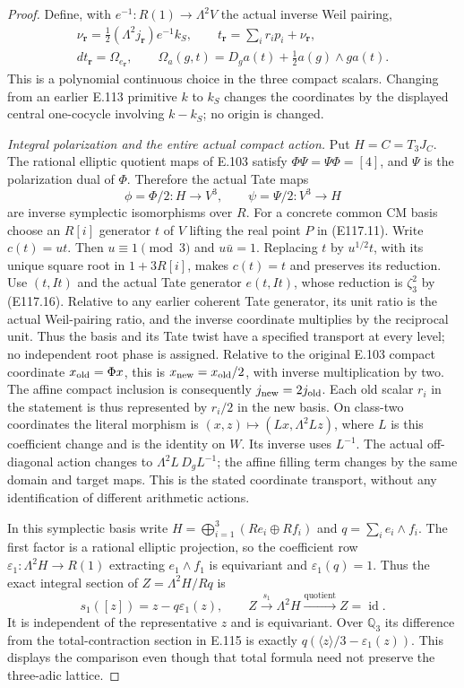 \begin{proof}
Define, with $e^{-1}:R(1)\to\Lambda^2V$ the actual inverse
Weil pairing,
\[
 \begin{gathered}
 \nu_{\mathbf r}=\tfrac12(\Lambda^2j_{\mathbf r})e^{-1}k_S,
 \qquad t_{\mathbf r}=\sum_i r_i p_i+\nu_{\mathbf r},\\
 dt_{\mathbf r}=\Omega_{e_{\mathbf r}},\qquad
 \Omega_a(g,t)=D_ga(t)+\tfrac12a(g)\wedge g a(t).
 \end{gathered}
 \tag{E117.22}
\]
This is a polynomial continuous choice in the three compact
scalars.  Changing from an earlier E.113 primitive $k$ to
$k_S$ changes the coordinates by the displayed central
one-cocycle involving $k-k_S$; no origin is changed.

\emph{Integral polarization and the entire actual compact action.}
Put $H=C=T_3J_C$.
The rational elliptic quotient maps of E.103 satisfy
$\Phi\Psi=\Psi\Phi=[4]$, and $\Psi$ is the polarization
dual of $\Phi$.  Therefore the actual Tate maps
\[
 \phi=\Phi/2:H\longrightarrow V^3,\qquad
 \psi=\Psi/2:V^3\longrightarrow H
 \tag{E117.23}
\]
are inverse symplectic isomorphisms over $R$.
For a concrete common CM basis choose an $R[i]$ generator
$t$ of $V$ lifting the real point $P$ in (E117.11).
Write $c(t)=u t$.  Then $u\equiv1\pmod3$ and
$u\bar u=1$.  Replacing $t$ by $u^{1/2}t$, with its unique
square root in $1+3R[i]$, makes $c(t)=t$ and preserves its
reduction.  Use $(t,It)$ and the actual Tate generator
$e(t,It)$, whose reduction is $\zeta_3^2$ by (E117.16).
Relative to any earlier coherent Tate generator, its unit
ratio is the actual Weil-pairing ratio, and the inverse
coordinate multiplies by the reciprocal unit.  Thus the
basis and its Tate twist have a specified transport at
every level; no independent root phase is assigned.
Relative to the original E.103 compact coordinate
$x_{\rm old}=\Phi x$, this is $x_{\rm new}=x_{\rm old}/2$,
with inverse multiplication by two.  The affine compact
inclusion is consequently $j_{\rm new}=2j_{\rm old}$.
Each old scalar $r_i$ in the statement is thus represented
by $r_i/2$ in the new basis.  On class-two coordinates the
literal morphism is $(x,z)\mapsto(Lx,\Lambda^2Lz)$,
where $L$ is this coefficient change and is the identity
on $W$.  Its inverse uses $L^{-1}$.  The actual off-diagonal
action changes to $\Lambda^2L\,D_gL^{-1}$; the affine
filling term changes by the same domain and target maps.
This is the stated coordinate transport, without any
identification of different arithmetic actions.

In this symplectic basis write
$H=\bigoplus_{i=1}^3(Re_i\oplus Rf_i)$ and
$q=\sum_i e_i\wedge f_i$.  The first factor is a rational
elliptic projection, so the coefficient row
$\varepsilon_1:\Lambda^2H\to R(1)$ extracting
$e_1\wedge f_1$ is equivariant and
$\varepsilon_1(q)=1$.  Thus the exact integral section of
$Z=\Lambda^2H/Rq$ is
\[
 s_1([z])=z-q\varepsilon_1(z),\qquad
 Z\xrightarrow{s_1}\Lambda^2H
       \xrightarrow{\text{quotient}}Z=\operatorname{id}.
 \tag{E117.24}
\]
It is independent of the representative $z$ and is equivariant.
Over $\mathbb Q_3$ its difference from the total-contraction
section in E.115 is exactly
$q(\langle z\rangle/3-\varepsilon_1(z))$.
This displays the comparison even though that total formula
need not preserve the three-adic lattice.


\end{proof}
